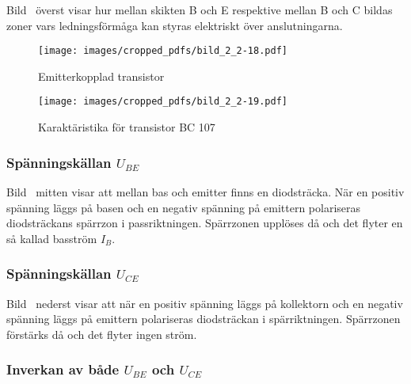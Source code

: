 
Bild~ överst visar hur mellan skikten B och E respektive
mellan B och C bildas zoner vars ledningsförmåga kan styras elektriskt över
anslutningarna.

\begin{figure*}[p]
  \begin{center}
    \texttt{[image: images/cropped\_pdfs/bild\_2\_2-18.pdf]}
    \caption{Emitterkopplad transistor}
    \label{fig:BildII2-18}
  \end{center}
\end{figure*}

\begin{figure*}[p]
  \begin{center}
    \texttt{[image: images/cropped\_pdfs/bild\_2\_2-19.pdf]}
    \caption{Karaktäristika för transistor BC 107}
    \label{fig:BildII2-19}
  \end{center}
\end{figure*}

\subsubsection{Spänningskällan \(U_{BE}\)}

Bild~ mitten visar att mellan bas och emitter finns en
diodsträcka.
När en positiv spänning läggs på basen och en negativ spänning på emittern
polariseras diodsträckans spärrzon i passriktningen.
Spärrzonen upplöses då och det flyter en så kallad basström \(I_B\).

\subsubsection{Spänningskällan \(U_{CE}\)}

Bild~ nederst visar att när en positiv spänning läggs på
kollektorn och en negativ spänning läggs på emittern polariseras diodsträckan i
spärriktningen.
Spärrzonen förstärks då och det flyter ingen ström.

\subsubsection{Inverkan av både \(U_{BE}\) och \(U_{CE}\)}

